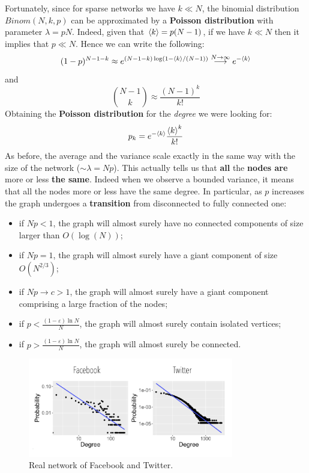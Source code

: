 \documentclass[../main/main.tex]{subfiles}
\begin{document}
Fortunately, since for sparse networks we have \( k \ll N \), the binomial distribution \( Binom(N,k,p) \)  can be approximated by a \textbf{Poisson distribution} with parameter \( \lambda = p N \). Indeed, given that  \( \expval{k} = p(N-1)  \), if we have \( k \ll N \) then it implies that \( p \ll N \). Hence we can write the following:
\begin{equation*}
  (1-p)^{N-1-k} \approx e^{(N-1-k) \log (1- \expval{k}/(N-1) )} \overset{N \rightarrow \infty }{\longrightarrow } e^{- \expval{k} }
\end{equation*}
and
\begin{equation*}
  \binom{N-1}{k} \approx \frac{(N-1)^k}{k!}
\end{equation*}
Obtaining the \textbf{Poisson distribution} for the \textit{degree} we were looking for:
\begin{equation}
  p_k = e^{- \expval{k} } \frac{\expval{k}^k }{k!}
\end{equation}
As before, the average and the variance scale exactly in the same way with the size of the network ($\sim \lambda = Np$). This actually tells us that \textbf{all} the \textbf{nodes are} more or less \textbf{the same}. Indeed when we observe a bounded variance, it means that all the nodes more or less have the same degree.
In particular, as $p$ increases the graph undergoes a \textbf{transition} from disconnected to fully connected one:
\begin{itemize}
\item if \( N p < 1 \), the graph will almost surely have no connected components of size larger than \( O(\log(N)) \);
\item if \( N p = 1 \), the graph will almost surely have a giant component of size \( O(N^{2/3}) \);
\item if \( N p \rightarrow c > 1 \), the graph will almost surely have a giant component comprising a large fraction of the nodes;
\item if \( p < \frac{(1- \varepsilon )\ln N}{N} \), the graph will almost surely contain isolated vertices;
\item if \( p > \frac{(1- \varepsilon )\ln N}{N} \),  the graph will almost surely be connected.
\end{itemize}

\begin{figure}[h!]
\centering
\includegraphics[width=0.8\textwidth]{../lessons/image/06/4.png}
\caption{\label{fig:06_3} Real network of Facebook and Twitter.}
\end{figure}
\end{document}
